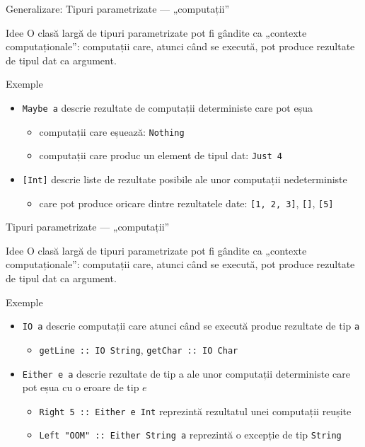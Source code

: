 \documentclass[xcolor=pdftex,romanian,colorlinks]{beamer}
\begin{document}
\begin{frame}[fragile]{Generalizare: Tipuri parametrizate --- „computații”}
\begin{block}{Idee}
O clasă largă de tipuri parametrizate pot fi gândite ca „contexte computaționale”: computații care, atunci când se execută, pot produce rezultate de tipul dat ca argument.
\end{block}
\vfill
\begin{block}{Exemple}
\begin{itemize}
\item \lstinline$Maybe a$ descrie rezultate de computații deterministe care pot eșua
\begin{itemize}
\item computații care eșuează: \lstinline$Nothing$
\item computații care produc un element de tipul dat: \lstinline$Just 4$
\end{itemize}
\item \lstinline$[Int]$ descrie liste de rezultate posibile ale unor computații nedeterministe 
\begin{itemize}
\item care pot produce oricare dintre rezultatele date: \lstinline$[1, 2, 3]$, \lstinline$[]$, \lstinline$[5]$
\end{itemize}
\end{itemize}
\end{block}
\end{frame}

\begin{frame}[fragile]{Tipuri parametrizate --- „computații”}
\begin{block}{Idee}
O clasă largă de tipuri parametrizate pot fi gândite ca „contexte computaționale”: computații care, atunci când se execută, pot produce rezultate de tipul dat ca argument.
\end{block}
\vfill
\begin{block}{Exemple}
\begin{itemize}
\item \lstinline$IO a$ descrie computații care atunci când se execută produc rezultate de tip \lstinline$a$
\begin{itemize}
\item \lstinline$getLine :: IO String$, \lstinline$getChar :: IO Char$
\end{itemize}
\item \lstinline$Either e a$ descrie rezultate de tip a ale unor computații deterministe care pot eșua cu o eroare de tip $e$
\begin{itemize}
\item \lstinline$Right 5 :: Either e Int$ reprezintă rezultatul unei computații reușite
\item \lstinline$Left "OOM" :: Either String a$ reprezintă o excepție de tip \lstinline$String$
\end{itemize}
\end{itemize}
\end{block}
\end{frame}
\end{document}
